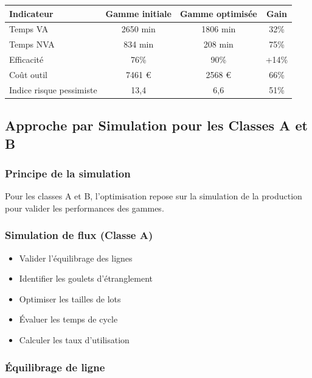 \documentclass{article}
\begin{document}
\begin{table}[h]
\begin{tcolorbox}[colback=grisclair, colframe=gray!70!black, title=Résultats pour une pièce aéronautique]
\begin{tabular}{|l|c|c|c|}
\hline
\textbf{Indicateur} & \textbf{Gamme initiale} & \textbf{Gamme optimisée} & \textbf{Gain} \\
\hline
Temps VA & 2650 min & 1806 min & 32\% \\
Temps NVA & 834 min & 208 min & 75\% \\
Efficacité & 76\% & 90\% & +14\% \\
Coût outil & 7461 € & 2568 € & 66\% \\
Indice risque pessimiste & 13,4 & 6,6 & 51\% \\
\hline
\end{tabular}
\end{tcolorbox}

\subsection{Approche par Simulation pour les Classes A et B}

\subsubsection{Principe de la simulation}

Pour les classes A et B, l'optimisation repose sur la simulation de la production pour valider les performances des gammes.

\subsubsection{Simulation de flux (Classe A)}

\begin{tcolorbox}[colback=vertclair, colframe=green!50!black, title=Objectifs de la simulation de flux]
\begin{itemize}
    \item Valider l'équilibrage des lignes
    \item Identifier les goulets d'étranglement
    \item Optimiser les tailles de lots
    \item Évaluer les temps de cycle
    \item Calculer les taux d'utilisation
\end{itemize}
\end{tcolorbox}

\subsubsection{Équilibrage de ligne}


\end{table}
\end{document}
